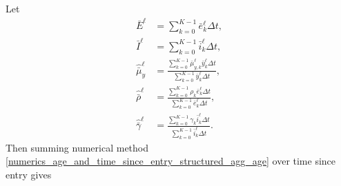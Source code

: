 \documentclass[USenglish]{article}
\begin{document}
Let
\begin{subequations}
  \begin{align}
    \bar{E}^{\ell}
    &= \sum_{k = 0}^{K - 1} \bar{e}_k^{\ell} \Delta t,
    \\
    \bar{I}^{\ell}
    &= \sum_{k = 0}^{K - 1} \bar{i}_k^{\ell} \Delta t,
    \\
    \hat{\bar{\mu}}_y^{\ell}
    &= \frac{
      \sum_{k = 0}^{K - 1} \bar{\mu}_{y, k}^{\ell} \bar{y}_k^{\ell} \Delta t
    }{
      \sum_{k = 0}^{K - 1} \bar{y}_k^{\ell} \Delta t
    },
    \\
    \hat{\bar{\rho}}^{\ell}
    &= \frac{\sum_{k = 0}^{K - 1} \rho_k \bar{e}_k^{\ell} \Delta t}
    {\sum_{k = 0}^{K - 1} \bar{e}_k^{\ell} \Delta t},
    \\
    \hat{\bar{\gamma}}^{\ell}
    &= \frac{\sum_{k = 0}^{K - 1} \gamma_k \bar{i}_k^{\ell} \Delta t}
    {\sum_{k = 0}^{K - 1} \bar{i}_k^{\ell} \Delta t}.
  \end{align}
\end{subequations}
Then summing numerical method
\eqref{numerics_age_and_time_since_entry_structured_agg_age} over
time since entry gives
\end{document}

